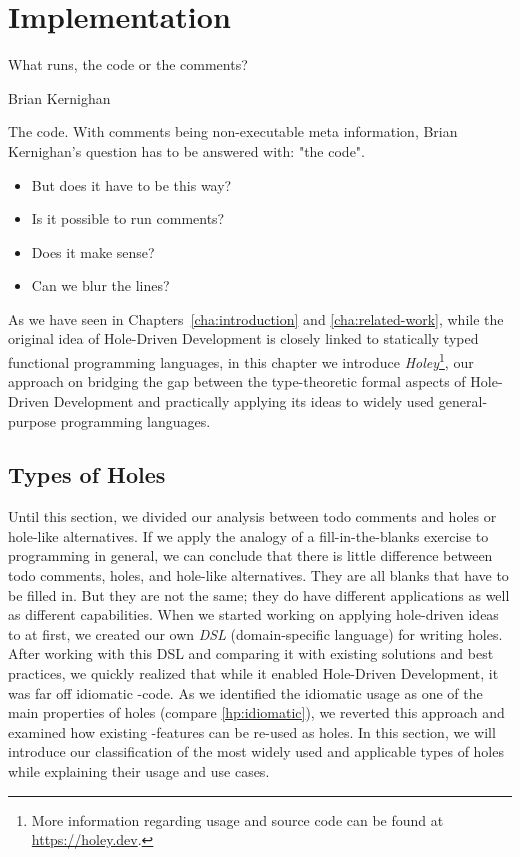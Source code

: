 \chapter{Implementation}
\label{cha:implementation}
\epigraph{What runs, the code or the comments?}{Brian Kernighan}

\noindent
The code.
With comments being non-executable meta information, Brian Kernighan's question has to be answered with: "the code".
\begin{itemize}
    \item But does it have to be this way?
    \item Is it possible to run comments?
    \item Does it make sense?
    \item Can we blur the lines?
\end{itemize}
As we have seen in Chapters~\ref{cha:introduction} and \ref{cha:related-work}, while the original idea of Hole-Driven Development is closely linked to statically typed functional programming languages, in this chapter we introduce \emph{Holey}\footnote{More information regarding usage and source code can be found at \url{https://holey.dev}.}, our approach on bridging the gap between the type-theoretic formal aspects of Hole-Driven Development and practically applying its ideas to widely used general-purpose programming languages.

\section{Types of Holes}
\label{sec:holey-types-of-holes}
Until this section, we divided our analysis between todo comments and holes or hole-like alternatives.
If we apply the analogy of a fill-in-the-blanks exercise to programming in general, we can conclude that there is little difference between todo comments, holes, and hole-like alternatives.
They are all blanks that have to be filled in.
But they are not the same; they do have different applications as well as different capabilities.
When we started working on applying hole-driven ideas to \CS at first, we created our own \emph{DSL} (domain-specific language) for writing holes.
After working with this DSL and comparing it with existing solutions and best practices, we quickly realized that while it enabled Hole-Driven Development, it was far off idiomatic \CS-code.
As we identified the idiomatic usage as one of the main properties of holes (compare \ref{hp:idiomatic}), we reverted this approach and examined how existing \CS-features can be re-used as holes.
In this section, we will introduce our classification of the most widely used and applicable types of holes while explaining their usage and use cases. 

